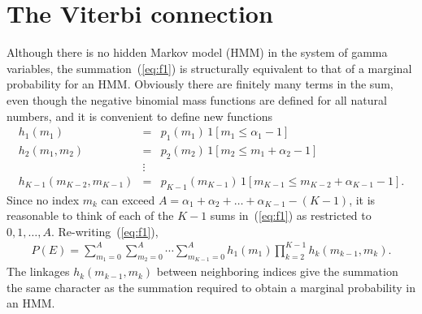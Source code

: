\section{The Viterbi connection}

Although there is no hidden Markov model (HMM) in the system of gamma
variables, the summation~(\ref{eq:f1}) is structurally equivalent to
that of a marginal probability for an HMM.  Obviously there are finitely
many terms in the sum, even though the negative binomial mass functions
are defined for all natural numbers, and it is convenient to define new
functions
\begin{eqnarray*}
h_1(m_1) & = & p_1( m_1 ) \, 1[ m_1 \leq \alpha_1 - 1 ]  \\ 
h_2(m_1,m_2) & = & p_2( m_2 ) \, 1[ m_2 \leq m_1 + \alpha_2 - 1 ]  \\
     & \vdots & \\
h_{K-1}(m_{K-2}, m_{K-1}) &= & p_{K-1}(m_{K-1}) \, 1[ m_{K-1} \leq m_{K-2} 
		+ \alpha_{K-1} -1 ].
\end{eqnarray*}
Since no index $m_k$ can exceed $A = \alpha_1 + \alpha_2 + \ldots + 
 \alpha_{K-1} - (K-1)$,
 it is reasonable to 
think of each of the $K-1$ sums in~(\ref{eq:f1}) as restricted to
$0, 1, \ldots, A$.  Re-writing~(\ref{eq:f1}),
\begin{eqnarray}
\label{eq:f2}
P(E) = \sum_{m_1 = 0}^A \sum_{m_2 = 0}^A \cdots \sum_{m_{K-1}=0}^A
  h_1(m_1) \prod_{k=2}^{K-1} h_k(m_{k-1}, m_{k} ) .
\end{eqnarray}
The linkages $h_k( m_{k-1}, m_k )$ between neighboring indices 
give the summation the same character as the summation required to
obtain a marginal probability in an HMM.


